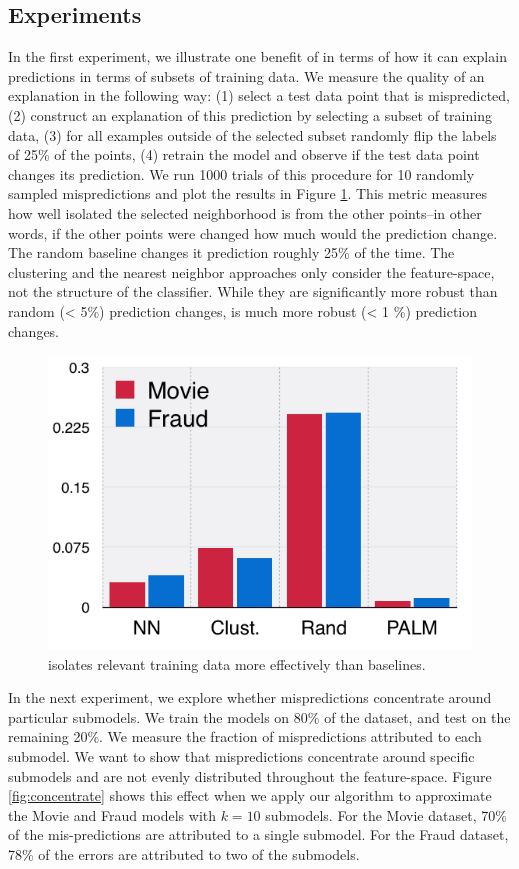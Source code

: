 \subsection{Experiments}

In the first experiment, we illustrate one benefit of \sys in terms of how it can explain predictions in terms of subsets of training data. We measure the quality of an explanation in the following way: (1) select a test data point that is mispredicted, (2) construct an explanation of this prediction by selecting a subset of training data, (3) for all examples outside of the selected subset randomly flip the labels of 25\% of the points, (4) retrain the model and observe if the test data point changes its prediction. 
We run 1000 trials of this procedure for 10 randomly sampled mispredictions and plot the results in Figure \ref{fig:isolation}. 
This metric measures how well isolated the selected neighborhood is from the other points--in other words, if the other points were changed how much would the prediction change.
The random baseline changes it prediction roughly 25\% of the time.
The clustering and the nearest neighbor approaches only consider the feature-space, not the structure of the classifier.
While they are significantly more robust than random (< 5\%) prediction changes, \sys is much more robust (< 1 \%) prediction changes.

\begin{figure}[ht]
    \centering
    \includegraphics[width=0.7\columnwidth]{figures/isolation.png}
    \caption{\sys isolates relevant training data more effectively than baselines.}
    \label{fig:isolation}
\end{figure}

In the next experiment, we explore whether mispredictions concentrate around particular submodels. We train the models on 80\% of the dataset, and test on the remaining 20\%. We measure the fraction of mispredictions attributed to each submodel. We want to show that mispredictions concentrate around specific submodels and are not evenly distributed throughout the feature-space. Figure \ref{fig:concentrate} shows this effect when we apply our algorithm to approximate the Movie and Fraud models with $k=10$ submodels. For the Movie dataset, 70\% of the mis-predictions are attributed to a single submodel.
For the Fraud dataset, 78\% of the errors are attributed to two of the submodels.

